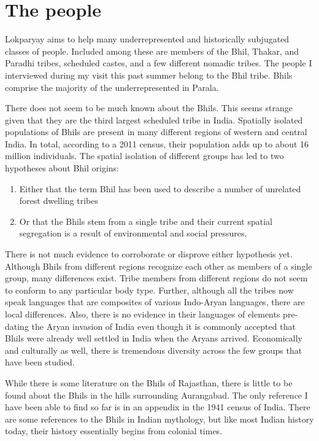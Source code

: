 \documentclass[report.tex]{subfiles}
\begin{document}
\section{The people}

Lokparyay aims to help many underrepresented and historically subjugated classes of people. Included among these are members of the Bhil, Thakar, and Paradhi tribes, scheduled castes, and a few different nomadic tribes. The people I interviewed during my visit this past summer belong to the Bhil tribe. Bhils comprise the majority of the underrepresented in Parala.

There does not seem to be much known about the Bhils. This seems strange given that they are the third largest scheduled tribe in India. Spatially isolated populations of Bhils are present in many different regions of western and central India. In total, according to a 2011 census, their population adds up to about 16 million individuals. The spatial isolation of different groups has led to two hypotheses about Bhil origins:
\begin{enumerate}
\item Either that the term Bhil has been used to describe a number of unrelated forest dwelling tribes
\item Or that the Bhils stem from a single tribe and their current spatial segregation is a result of environmental and social pressures.
\end{enumerate}

There is not much evidence to corroborate or disprove either hypothesis yet. Although Bhils from different regions recognize each other as members of a single group, many differences exist. Tribe members from different regions do not seem to conform to any particular body type. Further, although all the tribes now speak languages that are composites of various Indo-Aryan languages, there are local differences. Also, there is no evidence in their languages of elements pre-dating the Aryan invasion of India even though it is commonly accepted that Bhils were already well settled in India when the Aryans arrived. Economically and culturally as well, there is tremendous diversity across the few groups that have been studied.

While there is some literature on the Bhils of Rajasthan, there is little to be found about the Bhils in the hills surrounding Aurangabad. The only reference I have been able to find so far is in an appendix in the 1941 census of India. There are some references to the Bhils in Indian mythology, but like most Indian history today, their history essentially begins from colonial times.
\end{document}

